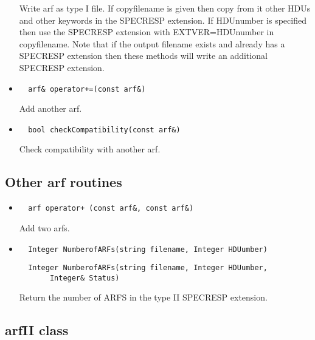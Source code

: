 \documentclass[11pt]{book}
\begin{document}
\begin{itemize}
          Write arf as type I file. If copyfilename is given then
          copy from it other HDUs and other keywords in the SPECRESP
          extension. If HDUnumber is specified then use the SPECRESP
          extension with EXTVER=HDUnumber in copyfilename. Note that 
          if the output filename exists and already has a SPECRESP 
          extension then these methods will write an
          additional SPECRESP extension.

\item  \begin{verbatim}  arf& operator+=(const arf&) \end{verbatim}

          Add another arf.

\item  \begin{verbatim}  bool checkCompatibility(const arf&) \end{verbatim}

          Check compatibility with another arf.

\end{itemize}

\subsection{Other arf routines}

\begin{itemize}

\item  \begin{verbatim}  arf operator+ (const arf&, const arf&) \end{verbatim}

          Add two arfs.

\item  \begin{verbatim}  Integer NumberofARFs(string filename, Integer HDUumber) \end{verbatim}
       \begin{verbatim}  Integer NumberofARFs(string filename, Integer HDUumber, 
       Integer& Status) \end{verbatim}

          Return the number of ARFS in the type II SPECRESP extension.

\end{itemize}


\subsection{arfII class}
\end{document}

